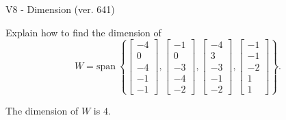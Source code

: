 \begin{exercise}
  \begin{exerciseTitle}V8 - Dimension (ver. 641)\end{exerciseTitle}
  \begin{exerciseStatement}
    Explain how to find the dimension of 
\[W=\mathrm{span}\ \left\{\left[\begin{array}{r}
-4 \\
0 \\
-4 \\
-1 \\
-1
\end{array}\right] , \left[\begin{array}{r}
-1 \\
0 \\
-3 \\
-4 \\
-2
\end{array}\right] , \left[\begin{array}{r}
-4 \\
3 \\
-3 \\
-1 \\
-2
\end{array}\right] , \left[\begin{array}{r}
-1 \\
-1 \\
-2 \\
1 \\
1
\end{array}\right]\right\}.\]



  \end{exerciseStatement}
  \begin{exerciseAnswer}
   The dimension of \(W\) is  \(4\).
  


  \end{exerciseAnswer}
\end{exercise}